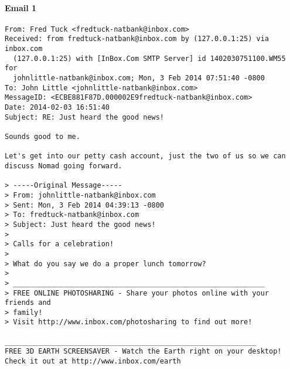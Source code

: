 \paragraph{Email 1}
\label{MailNomad1}
\begin{verbatim}
From: Fred Tuck <fredtuck-natbank@inbox.com>
Received: from fredtuck-natbank@inbox.com by (127.0.0.1:25) via inbox.com
  (127.0.0.1:25) with [InBox.Com SMTP Server] id 1402030751100.WM55 for
  johnlittle-natbank@inbox.com; Mon, 3 Feb 2014 07:51:40 -0800
To: John Little <johnlittle-natbank@inbox.com>
MessageID: <ECBE881F87D.000002E9fredtuck-natbank@inbox.com>
Date: 2014-02-03 16:51:40
Subject: RE: Just heard the good news!

Sounds good to me.

Let's get into our petty cash account, just the two of us so we can discuss Nomad going forward.

> -----Original Message-----
> From: johnlittle-natbank@inbox.com
> Sent: Mon, 3 Feb 2014 04:39:13 -0800
> To: fredtuck-natbank@inbox.com
> Subject: Just heard the good news!
> 
> Calls for a celebration!
> 
> What do you say we do a proper lunch tomorrow?
> 
> ____________________________________________________________
> FREE ONLINE PHOTOSHARING - Share your photos online with your friends and
> family!
> Visit http://www.inbox.com/photosharing to find out more!

____________________________________________________________
FREE 3D EARTH SCREENSAVER - Watch the Earth right on your desktop!
Check it out at http://www.inbox.com/earth


\end{verbatim}

